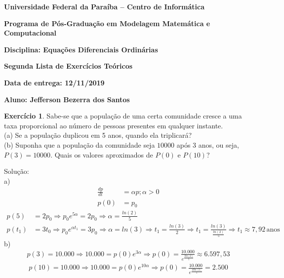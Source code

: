 \documentclass[a4paper,12pt,reqno,natbib]{amsart}
\theoremstyle{definition}
\newtheorem{exercise}{Exerc\'icio}
\newcommand{\derivada}[2]{\frac{#1}{#2}}
\newcommand{\mathbox}[1]{\hspace{2pt}\mbox{#1}}
\begin{document}
\textbf{Universidade Federal da Paraíba -- Centro de Informática}

\vspace{0.3 cm}

\textbf{Programa de Pós-Graduação em Modelagem Matemática e Computacional}

\vspace{0.3 cm}

\textbf{Disciplina: Equações Diferenciais Ordinárias}

\vspace{0.3 cm}

\textbf{Segunda Lista de Exercícios Teóricos}

\vspace{0.3 cm}

\textbf{Data de entrega: 12/11/2019}

\vspace{0.3 cm}

\textbf{Aluno: Jefferson Bezerra dos Santos}


\vspace{1.5 cm}



\begin{center}
\end{center}

\vspace{0.7 cm}

\begin{exercise}
Sabe-se que a população de uma certa comunidade cresce a uma taxa proporcional ao número de pessoas presentes em qualquer instante. \\
(a) Se a população duplicou em 5 anos, quando ela triplicará? \\
(b) Suponha que a população da comunidade seja $10000$ após $3$ anos, ou seja, $P(3) = 10000$. Quais os valores aproximados de $P(0)$ e $P(10)$?
\end{exercise}
Solu\c c\~ao: \\
a)
\begin{align*}
	\derivada{dp}{dt}  &= \alpha p; \alpha > 0 \\
	p(0) &= p_0
\end{align*}
\begin{align*}
	p(5) &= 2p_0 \Rightarrow p_0e^{5\alpha} = 2p_0 \Rightarrow \alpha = \frac{ln(2)}{5} \\
	p(t_1) &= 3t_0 \Rightarrow p_0 e^{\alpha t_1} = 3p_0 \Rightarrow \alpha = ln(3) \Rightarrow t_1 =
	\frac{ln(3)}{2} \Rightarrow t_1 = \frac{ln(3)}{\frac{ln(2)}{5}} \Rightarrow t_1 \approx 7,92 \mathbox{anos}
\end{align*}
b)
\begin{align*}
	p(3) = 10.000 \Rightarrow 10.000 = p(0)e^{3\alpha} \Rightarrow p(0) = \frac{10.000}{e^{\frac{3ln(2)}{5}}} \approx
	6.597,53
\end{align*}
\begin{align*}
	p(10) = 10.000 \Rightarrow 10.000 = p(0)e^{10\alpha} \Rightarrow p(0) = \frac{10.000}{e^{\frac{10ln(2)}{5}}} =
	2.500
\end{align*}
\end{document}
